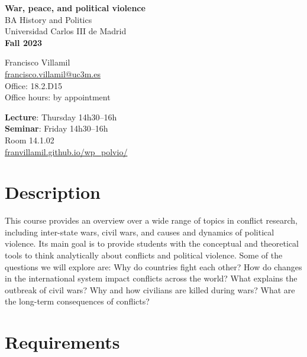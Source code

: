 \documentclass[12pt, a4paper]{article}
\begin{document}
\begin{center}
{\LARGE\bfseries War, peace, and political violence}\\\vspace{10pt}
BA History and Politics\\
Universidad Carlos III de Madrid\\\vspace{10pt}
{\large\bfseries Fall 2023}\\
\end{center}

\vspace{20pt}

\begin{minipage}{0.54\textwidth}
\flushleft
Francisco Villamil\\
\href{francisco.villamil@uc3m.es}{francisco.villamil@uc3m.es}\\
Office: 18.2.D15\\
Office hours: by appointment
\end{minipage}\hfill
\begin{minipage}{0.39\textwidth}
\flushleft
\textbf{Lecture}: Thursday 14h30--16h\\
\textbf{Seminar}: Friday 14h30--16h\\\vspace{5pt}
Room 14.1.02\\
\href{https://franvillamil.github.io/wp_polvio/}{franvillamil.github.io/wp\_polvio/}
\end{minipage}


\vspace{10pt}
\section{Description}

This course provides an overview over a wide range of topics in conflict research, including inter-state wars, civil wars, and causes and dynamics of political violence.
Its main goal is to provide students with the conceptual and theoretical tools to think analytically about conflicts and political violence. Some of the questions we will explore are: Why do countries fight each other? How do changes in the international system impact conflicts across the world? What explains the outbreak of civil wars? Why and how civilians are killed during wars? What are the long-term consequences of conflicts?

\section{Requirements}
\end{document}
